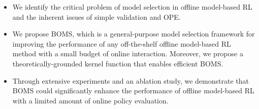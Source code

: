 \begin{itemize}
\item We identify the critical problem of model selection in offline model-based RL and the inherent issues of simple validation and OPE.
\item We propose BOMS, which is a general-purpose model selection framework for improving the performance of any off-the-shelf offline model-based RL method with a small budget of online interaction. Moreover, we propose a theoretically-grounded kernel function that enables efficient BOMS.
\item Through extensive experiments and an ablation study, we demonstrate that BOMS could significantly enhance the performance of offline model-based RL with a limited amount of online policy evaluation.
\end{itemize}
